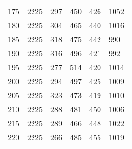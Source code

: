 \begin{longtable}{|l|l|l|l|l|l|}
175 & 2225 & 297 & 450 & 426 & 1052 \\
180 & 2225 & 304 & 465 & 440 & 1016 \\
185 & 2225 & 318 & 475 & 442 & 990 \\
190 & 2225 & 316 & 496 & 421 & 992 \\
195 & 2225 & 277 & 514 & 420 & 1014 \\
200 & 2225 & 294 & 497 & 425 & 1009 \\
205 & 2225 & 323 & 473 & 419 & 1010 \\
210 & 2225 & 288 & 481 & 450 & 1006 \\
215 & 2225 & 289 & 466 & 448 & 1022 \\
220 & 2225 & 266 & 485 & 455 & 1019 \\

	
	
	
	\bottomrule
\end{longtable}




